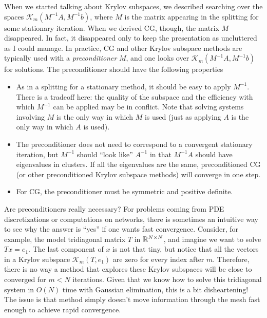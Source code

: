 \documentclass[12pt, leqno]{article}
\newcommand{\calK}{\mathcal{K}}
\begin{document}
When we started talking about Krylov subspaces, we described searching
over the spaces $\calK_m(M^{-1} A, M^{-1} b)$, where $M$ is the matrix
appearing in the splitting for some stationary iteration.  When we
derived CG, though, the matrix $M$ disappeared.  In fact, it
disappeared only to keep the presentation as uncluttered as I could
manage.  In practice, CG and other Krylov subspace methods are
typically used with a {\em preconditioner} $M$, and one looks over
$\calK_m(M^{-1} A, M^{-1} b)$ for solutions.  The preconditioner
should have the following properties
\begin{itemize}
\item
  As in a splitting for a stationary method, it should be easy to
  apply $M^{-1}$.  There is a tradeoff here: the quality of the
  subspace and the efficiency with which $M^{-1}$ can be applied may
  be in conflict.  Note that solving systems involving $M$ is the only
  way in which $M$ is used (just as applying $A$ is the only way in
  which $A$ is used).
\item
  The preconditioner does not need to correspond to a convergent
  stationary iteration, but $M^{-1}$ should ``look like'' $A^{-1}$
  in that $M^{-1} A$ should have eigenvalues in clusters.  If all the
  eigenvalues are the same, preconditioned CG (or other preconditioned
  Krylov subspace methods) will converge in one step.
\item
  For CG, the preconditioner must be symmetric and positive definite.
\end{itemize}

Are preconditioners really necessary?  For problems coming from PDE
discretizations or computations on networks, there is sometimes an
intuitive way to see why the answer is ``yes'' if one wants fast
convergence.  Consider, for example, the model tridiagonal matrix $T$
in $\mathbb{R}^{N \times N}$, and imagine we want to solve $Tx = e_1$.  The
last component of $x$ is not that tiny, but notice that all the
vectors in a Krylov subspace $\calK_m(T, e_1)$ are zero for every
index after $m$.  Therefore, there is no way a method that explores
these Krylov subspaces will be close to converged for $m < N$
iterations.  Given that we know how to solve this tridiagonal system
in $O(N)$ time with Gaussian elimination, this is a bit disheartening!
The issue is that method simply doesn't move information through the
mesh fast enough to achieve rapid convergence.
\end{document}
